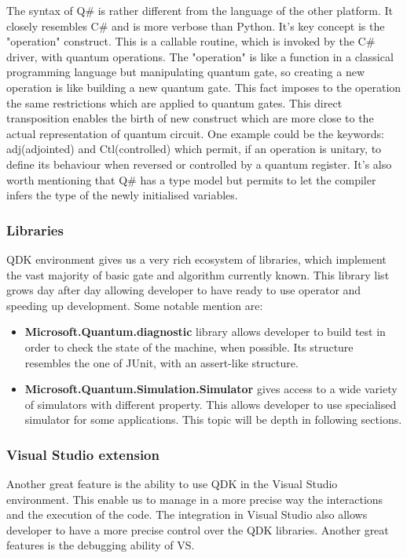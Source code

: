 \documentclass[main.tex]{subfiles}
\begin{document}
	The syntax of Q\# is rather different from the language of the other platform. It closely resembles C\# and is more verbose than Python. It's key concept is the "operation" construct. This is a callable routine, which is invoked by the C\# driver, with quantum operations. The "operation" is like a function in a classical programming language but manipulating quantum gate, so creating a new operation is like building a new quantum gate. This fact imposes to the operation the same restrictions which are applied to quantum gates. This direct transposition enables the birth of new construct which are more close to the actual representation of quantum circuit. One example could be the keywords: adj(adjointed) and Ctl(controlled) which permit, if an operation is unitary, to define its behaviour when reversed or controlled by a quantum register.
	It's also worth mentioning that Q\# has a type model but permits to let the compiler infers the type of the newly initialised variables.

	\subsubsection{Libraries}
	QDK environment gives us a very rich ecosystem of libraries, which implement the vast majority of basic gate and algorithm currently known. This library list grows day after day allowing developer to have ready to use operator and speeding up development. Some notable mention are:
	\begin{itemize}
	\item \textbf{Microsoft.Quantum.diagnostic} library allows developer to build test in order to check the state of the machine, when possible. Its structure resembles the one of JUnit, with an assert-like structure.
	\item \textbf{Microsoft.Quantum.Simulation.Simulator} gives access to a wide variety of simulators with different property. This allows developer to use specialised simulator for some applications. This topic will be depth in following sections.
	\end{itemize}
	
	\subsubsection{Visual Studio extension}
	Another great feature is the ability to use QDK in the Visual Studio environment. This enable us to manage in a more precise way the interactions and the execution of the code. The integration in Visual Studio also allows developer to have a more precise control over the QDK libraries. Another great features is the debugging ability of VS.
	
\end{document}

